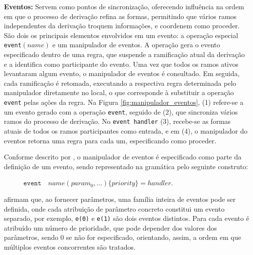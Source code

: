 \textbf{Eventos:} Servem como pontos de sincronização, oferecendo influência na ordem em que o processo de derivação refina as formas, permitindo que vários ramos independentes da derivação troquem informações, e coordenem como proceder. São dois os principais elementos envolvidos em um evento: a operação especial \texttt{event}$(name)$ e um manipulador de eventos. A operação gera o evento especificado dentro de uma regra, que suspende a ramificação atual da derivação e a identifica como participante do evento. Uma vez que todos os ramos ativos levantaram algum evento, o manipulador de eventos é consultado. Em seguida, cada ramificação é retomada, executando a respectiva regra determinada pelo manipulador diretamente no local, o que corresponde à substituir a operação \texttt{event} pelas ações da regra. Na Figura \ref{fig:manipulador_eventos}, (1) refere-se a um evento gerado com a operação \texttt{event}, seguido de (2), que sincroniza vários ramos do processo de derivação. No \texttt{event handler} (3), recebe-se as formas atuais de todos os ramos participantes como entrada, e em (4), o manipulador do eventos retorna uma regra para cada um, especificando como proceder. 

Conforme descrito por , o manipulador de eventos é especificado como parte da definição de um evento, sendo representado na gramática pelo seguinte construto:

\vspace{0.3cm}

\begin{description}
    \item[] \qquad \qquad $\texttt{event} \quad name(param_0 ,. . . ) \{ priority \} = handler$.
\end{description}

\vspace{0.3cm}

 afirmam que, ao fornecer parâmetros, uma família inteira de eventos pode ser definida, onde cada atribuição de parâmetro concreto constitui um evento separado, por exemplo, \texttt{e(0)} e \texttt{e(1)} são dois eventos distintos. Para cada evento é atribuído um número de prioridade, que pode depender dos valores dos parâmetros, sendo 0 se não for especificado, orientando, assim, a ordem em que múltiplos eventos concorrentes são tratados.

